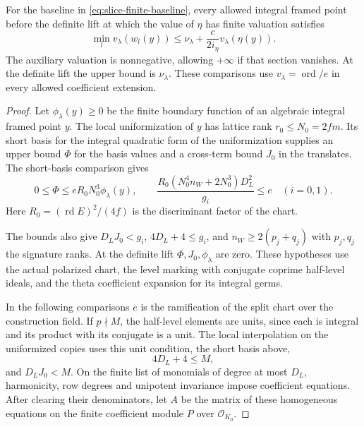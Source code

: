 \begin{proposition}
\label{prop:slice-finite-readings}
For the baseline in \eqref{eq:slice-finite-baseline}, every allowed
integral framed point before the definite lift at which the value of \(\eta\) has finite valuation satisfies
\[
 \min_l v_\lambda(w_l(y))\le
 \nu_\lambda+\frac{c}{2i_\eta}v_\lambda(\eta(y)).
\]
The auxiliary valuation is nonnegative, allowing \(+\infty\) if that
section vanishes. At the definite lift the upper bound is
\(\nu_\lambda\). These comparisons use \(v_\lambda=\operatorname{ord}/e\)
in every allowed coefficient extension.
\end{proposition}

\begin{proof}
Let \(\phi_\lambda(y)\ge0\) be the finite boundary function of
an algebraic integral framed point \(y\). The local
uniformization of \(y\) has lattice rank \(r_0\le N_0=2fm\).
Its short basis for the integral quadratic form of the
uniformization supplies an upper bound \(\Phi\) for the basis
values and a cross-term bound \(J_0\) in the translates.
The short-basis comparison gives
\[
 0\le\Phi\le eR_0N_0^3\phi_\lambda(y),\qquad
 \frac{R_0(N_0^4 n_W+2N_0^3)D_L^2}{g_i}\le c\quad (i=0,1).
\]
Here \(R_0=(\operatorname{rd}E)^2/(4f)\)
is the discriminant factor of the chart.

The bounds also
give \(D_L J_0<g_i\), \(4D_L+4\le g_i\), and
\(n_W\ge2(p_j+q_j)\) with \(p_j,q_j\) the signature ranks.
At the definite lift \(\Phi,J_0,\phi_\lambda\) are zero.
These hypotheses use the actual polarized chart, the level
marking with conjugate coprime half-level ideals, and the
theta coefficient expansion for its integral germs.
\label{cor:slice-finite-depth-3}

In the following comparisons \(e\) is the ramification of
the split chart over the construction field. If \(p\nmid M\),
the half-level elements are units, since each is integral and
its product with its conjugate is a unit. The local interpolation
on the uniformized copies uses this unit condition, the short
basis above, 
\[
  4D_L+4\le M,
\]
 and \(D_LJ_0<M\). On the finite
list of monomials of degree at most \(D_L\), harmonicity, row
degrees and unipotent invariance impose coefficient equations.
After clearing their denominators, let \(A\) be the matrix
of these homogeneous equations on the finite coefficient
module \(P\) over \(\mathcal O_{K_0}\).


\end{proof}

